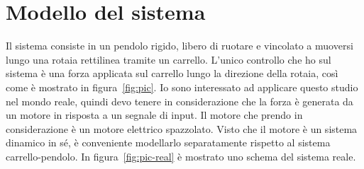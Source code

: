 \section{Modello del sistema}
Il sistema consiste in un pendolo rigido, libero di ruotare e vincolato a muoversi lungo una rotaia rettilinea tramite un carrello.
L'unico controllo che ho sul sistema è
una forza applicata sul carrello lungo la direzione della rotaia,
così come è mostrato in figura~\ref{fig:pic}.
Io sono interessato
ad applicare questo studio nel mondo reale, quindi devo tenere
in considerazione che la forza è generata da un motore in risposta
a un segnale di input.
Il motore che prendo in considerazione è un motore elettrico
spazzolato. Visto che il motore è un sistema dinamico in sé,
è conveniente modellarlo separatamente rispetto al sistema
carrello-pendolo.
In figura~\ref{fig:pic-real} è
mostrato uno schema del sistema reale.


